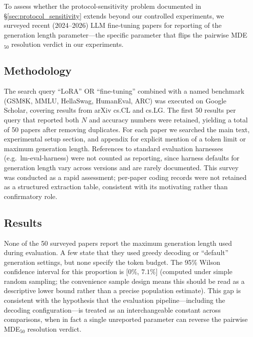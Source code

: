 \documentclass[pdflatex,sn-mathphys-ay,oneside]{sn-jnl}
\theoremstyle{thmstylethree}
\begin{document}
To assess whether the protocol-sensitivity problem documented in \S\ref{sec:protocol_sensitivity} extends beyond our controlled experiments, we surveyed recent (2024--2026) LLM fine-tuning papers for reporting of the generation length parameter---the specific parameter that flips the pairwise MDE$_{50}$ resolution verdict in our experiments.

\subsection{Methodology}

The search query ``LoRA'' OR ``fine-tuning'' combined with a named benchmark (GSM8K, MMLU, HellaSwag, HumanEval, ARC) was executed on Google Scholar, covering results from arXiv cs.CL and cs.LG. The first 50 results per query that reported both $N$ and accuracy numbers were retained, yielding a total of 50 papers after removing duplicates. For each paper we searched the main text, experimental setup section, and appendix for explicit mention of a token limit or maximum generation length. References to standard evaluation harnesses (e.g.\ lm-eval-harness) were not counted as reporting, since harness defaults for generation length vary across versions and are rarely documented. This survey was conducted as a rapid assessment; per-paper coding records were not retained as a structured extraction table, consistent with its motivating rather than confirmatory role.

\subsection{Results}

None of the 50 surveyed papers report the maximum generation length used during evaluation. A few state that they used greedy decoding or ``default'' generation settings, but none specify the token budget. The 95\% Wilson confidence interval for this proportion is [$0\%$, $7.1\%$] (computed under simple random sampling; the convenience sample design means this should be read as a descriptive lower bound rather than a precise population estimate). This gap is consistent with the hypothesis that the evaluation pipeline---including the decoding configuration---is treated as an interchangeable constant across comparisons, when in fact a single unreported parameter can reverse the pairwise MDE$_{50}$ resolution verdict.

\end{document}
